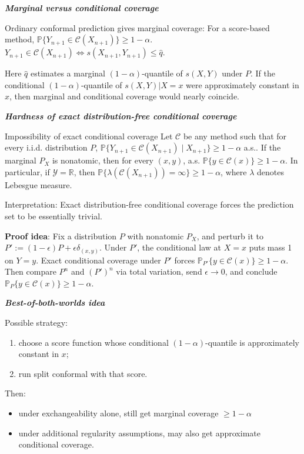 \emph{\textbf{Marginal versus conditional coverage}}


Ordinary conformal prediction gives marginal coverage:
For a score-based method, $\mathbb{P}\{Y_{n+1} \in \mathcal{C}(X_{n+1})\} \ge 1-\alpha$.
$Y_{n+1} \in \mathcal{C}(X_{n+1}) \iff s(X_{n+1}, Y_{n+1}) \le \hat{q}$.

Here $\hat{q}$ estimates a marginal $(1-\alpha)$-quantile of $s(X,Y)$ under $P$.
If the conditional $(1-\alpha)$-quantile of $s(X,Y)|X=x$ were approximately constant in $x$, then marginal and conditional coverage would nearly coincide.

\emph{\textbf{Hardness of exact distribution-free conditional coverage}}

\begin{thm}{Impossibility of exact conditional coverage}{}
Let $\mathcal{C}$ be any method such that for every i.i.d. distribution $P$, $\mathbb{P}\{Y_{n+1} \in \mathcal{C}(X_{n+1}) \mid X_{n+1}\} \ge 1-\alpha$ a.s..
If the marginal $P_X$ is nonatomic, then for every $(x,y)$, a.s. $\mathbb{P}\{y \in \mathcal{C}(x)\} \ge 1-\alpha$.
In particular, if $\mathcal{Y} = \mathbb{R}$, then $\mathbb{P}\{\lambda(\mathcal{C}(X_{n+1})) = \infty\} \ge 1-\alpha$, where $\lambda$ denotes Lebesgue measure.
\end{thm}

Interpretation: Exact distribution-free conditional coverage forces the prediction set to be essentially trivial.

\textbf{Proof idea}: Fix a distribution $P$ with nonatomic $P_X$, and perturb it to $P' := (1-\epsilon)P + \epsilon\delta_{(x,y)}$.
Under $P'$, the conditional law at $X=x$ puts mass 1 on $Y=y$. Exact conditional coverage under $P'$ forces $\mathbb{P}_{P'}\{y \in \mathcal{C}(x)\} \ge 1-\alpha$.
Then compare $P^n$ and $(P')^n$ via total variation, send $\epsilon \to 0$, and conclude $\mathbb{P}_P\{y \in \mathcal{C}(x)\} \ge 1-\alpha$.

\emph{\textbf{Best-of-both-worlds idea}}

Possible strategy:
\begin{enumerate}
    \item choose a score function whose conditional $(1-\alpha)$-quantile is approximately constant in $x$;
    \item run split conformal with that score.
\end{enumerate}
Then:
\begin{itemize}
    \item under exchangeability alone, still get marginal coverage $\ge 1-\alpha$
    \item under additional regularity assumptions, may also get approximate conditional coverage.
\end{itemize}

